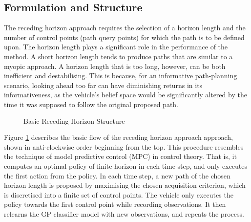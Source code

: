 		\subsection{Formulation and Structure}
		\label{InformativeSeafloorExploration:RecedingHorizonFormulation:Structure}
		
			The receding horizon approach requires the selection of a horizon length and the number of control points (path query points) for which the path is to be defined upon. The horizon length plays a significant role in the performance of the method. A short horizon length tends to produce paths that are similar to a myopic approach. A horizon length that is too long, however, can be both inefficient and destabilising. This is because, for an informative path-planning scenario, looking ahead too far can have diminishing returns in its informativeness, as the vehicle's belief space would be significantly altered by the time it was supposed to follow the original proposed path.
	
			\begin{figure}[!htbp]
				\begin{center}
				\end{center}
			\caption{Basic Receding Horizon Structure}
			\label{Figure:RecedingHorizonMethodOutline}
			\end{figure}
					
			Figure \ref{Figure:RecedingHorizonMethodOutline} describes the basic flow of the receding horizon approach approach, shown in anti-clockwise order beginning from the top. This procedure resembles the technique of model predictive control (MPC) in control theory. That is, it computes an optimal policy of finite horizon in each time step, and only executes the first action from the policy. In each time step, a new path of the chosen horizon length is proposed by maximising the chosen acquisition criterion, which is discretised into a finite set of control points. The vehicle only executes the policy towards the first control point while recording observations. It then relearns the GP classifier model with new observations, and repeats the process.
	
